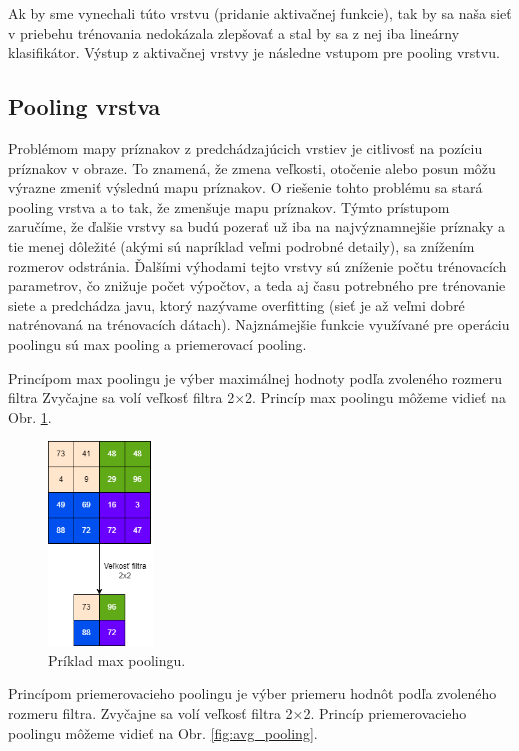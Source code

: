 Ak by sme vynechali túto vrstvu (pridanie aktivačnej funkcie), tak by sa naša sieť
v priebehu trénovania nedokázala zlepšovať a stal by sa z nej iba lineárny klasifikátor.
Výstup z aktivačnej vrstvy je následne vstupom pre pooling vrstvu.

\subsection{Pooling vrstva}

Problémom mapy príznakov z predchádzajúcich vrstiev je citlivosť na pozíciu príznakov
v obraze. To znamená, že zmena veľkosti, otočenie alebo posun môžu výrazne zmeniť
výslednú mapu príznakov. O riešenie tohto problému sa stará pooling vrstva a to tak, že
zmenšuje mapu príznakov. Týmto prístupom zaručíme, že ďalšie vrstvy sa budú pozerať už iba na najvýznamnejšie príznaky a tie menej dôležité (akými sú napríklad veľmi podrobné detaily), sa znížením rozmerov odstránia. Ďalšími výhodami tejto vrstvy sú
zníženie počtu trénovacích parametrov, čo znižuje počet výpočtov, a teda aj času potrebného pre trénovanie siete a predchádza javu, ktorý nazývame overfitting (sieť je až veľmi dobré natrénovaná na trénovacích dátach). Najznámejšie funkcie využívané pre
operáciu poolingu sú max pooling a priemerovací pooling.

Princípom max poolingu je výber maximálnej hodnoty podľa zvoleného rozmeru
filtra Zvyčajne sa volí veľkosť filtra 2×2. Princíp max poolingu môžeme vidieť
na Obr. \ref{fig:max_pooling}.

\begin{figure}[H]
\centerline{\includegraphics[width=0.25\textwidth]{images/max pool.drawio.png}}
\caption{Príklad max poolingu.}
\label{fig:max_pooling}
\end{figure}

Princípom priemerovacieho poolingu je výber priemeru hodnôt podľa zvoleného rozmeru filtra. Zvyčajne sa volí veľkosť filtra 2×2. Princíp priemerovacieho poolingu môžeme vidieť na Obr. \ref{fig:avg_pooling}.

